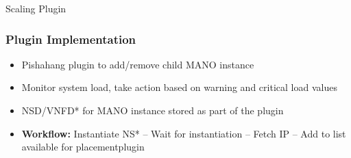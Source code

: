 \begin{frame}
\Huge{\centerline{Scaling Plugin}}
\end{frame}


\begin{frame}
\frametitle{Plugin Implementation}

\begin{itemize}[<+->]
	
	\item Pishahang plugin to add/remove child MANO instance
	\item Monitor system load, take action based on warning and critical load values
	\item NSD/VNFD* for MANO instance stored as part of the plugin 
	\item \textbf{Workflow:} Instantiate NS* -- Wait for instantiation -- Fetch IP -- Add to list available for placementplugin
	
\end{itemize}

\end{frame}
